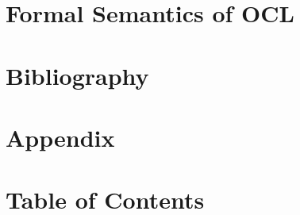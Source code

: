 \documentclass[fontsize=10pt,DIV12,paper=a4,open=right,twoside,abstract=true]{scrreprt}
\begin{document}
\part{Formal Semantics of OCL}

\isatagafp

\endisatagafp
\isatagnoexample

\endisatagnoexample
\isatagannexa















%
%
% 
% 


\part{Bibliography}
\endisatagannexa
\isatagafp
\endisatagafp



\isatagafp
\appendix
\part{Appendix}
\endisatagafp


\isatagannexa
  \part{Table of Contents}
  \clearpage {\small \tableofcontents }
\endisatagannexa
\end{document}
